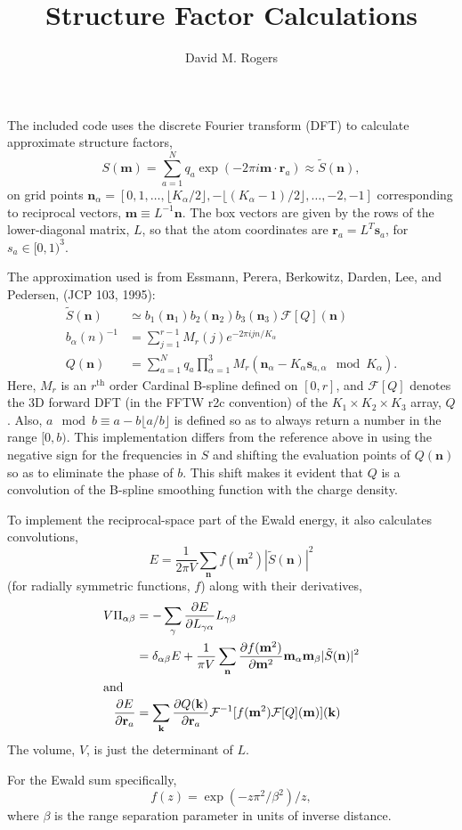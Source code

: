 \documentclass{amsart}
\title{ Structure Factor Calculations}
\author{ David M. Rogers}
\renewcommand{\vec}[1]{\mathbf{#1}}
\begin{document}
  The included code uses the discrete Fourier transform (DFT)
to calculate approximate structure factors,
\begin{equation}
S(\vec m) = \sum_{a=1}^N q_a \exp(-2\pi i \vec m\cdot \vec r_a)
  \approx \tilde S(\vec n),
\end{equation}
on grid points $\vec n_\alpha = [0, 1, \ldots, \lfloor K_\alpha/2 \rfloor, -\lfloor (K_\alpha-1)/2 \rfloor, \ldots, -2, -1]$
corresponding to reciprocal vectors, $\vec m \equiv L^{-1} \vec n$.
The box vectors are given by the rows of the lower-diagonal matrix,
$L$, so that the atom coordinates are $\vec r_a = L^T \vec s_a$,
for $s_a \in [0,1)^3$.

  The approximation used is from Essmann, Perera, Berkowitz,
Darden, Lee, and Pedersen, (JCP 103, 1995):
\begin{align}
\tilde S(\vec n) &\simeq b_1(\vec n_1) b_2(\vec n_2) b_3(\vec n_3)
                         \mathcal F[Q](\vec n) \\
b_\alpha(n)^{-1} &= \sum_{j=1}^{r-1} M_r(j) e^{-2\pi i j n/K_\alpha} \\
Q(\vec n) &= \sum_{a=1}^N q_a \prod_{\alpha=1}^3
                M_r(\vec n_\alpha - K_\alpha \vec s_{a,\alpha} \mod K_\alpha)
.
\end{align}
Here, $M_r$ is an $r^\text{th}$ order Cardinal B-spline defined on $[0,r]$,
and $\mathcal F[Q]$ denotes the 3D forward DFT (in the FFTW r2c convention)
of the $K_1 \times K_2 \times K_3$ array, $Q$.
Also, $a \mod b \equiv a - b \lfloor a/b \rfloor$
is defined so as to always return a number in the range $[0,b)$.
This implementation differs from the reference above in using the negative
sign for the frequencies in $S$ and shifting the evaluation points
of $Q(\vec n)$ so as to eliminate the phase of $b$.  This
shift makes it evident that $Q$ is a convolution of the B-spline
smoothing function with the charge density.

  To implement the reciprocal-space part of the Ewald energy, it also
calculates convolutions,
\begin{equation}
E = \frac{1}{2\pi V} \sum_{\vec n} f(\vec m^2) |\tilde S(\vec n)|^2
\end{equation}
(for radially symmetric functions, $f$)
along with their derivatives,
\begin{align}
V \Pi_{\alpha\beta} &= -\sum_\gamma \frac{\partial E}{\partial L_{\gamma\alpha}}
            L_{\gamma\beta} \\
  &= \delta_{\alpha\beta} E
        + \frac{1}{\pi V} \sum_{\vec n}
                            \frac{\partial f(\vec m^2)}{\partial \vec m^2}
            \vec m_\alpha \vec m_\beta |\tilde S(\vec n)|^2 \\
\intertext{and}
\frac{\partial E}{\partial \vec r_a} &= \sum_{\vec k}
  \frac{\partial Q(\vec k)}{\partial \vec r_a}
                    \mathcal F^{-1}[ f(\vec m^2) \mathcal F[Q](\vec m) ](\vec k)
\end{align}
The volume, $V$, is just the determinant of $L$.

  For the Ewald sum specifically,
\begin{equation}
f(z) = \exp(-z \pi^2/\beta^2) / z,
\end{equation}
where $\beta$ is the range separation parameter in units of inverse distance.
\end{document}
